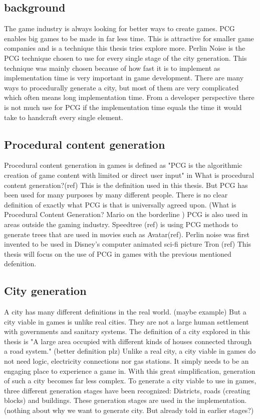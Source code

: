 	\subsection{background}
	The game industry is always looking for better ways to create games. PCG enables big games to be made in far less time. This is attractive for smaller game companies and is a technique this thesis tries explore more.
	Perlin Noise is the PCG technique chosen to use for every single stage of the city generation. This technique was mainly chosen because of how fast it is to implement as implementation time is very important in game development.
	There are many ways to procedurally generate a city, but most of them are very complicated which often means long implementation time. From a developer perspective there is not much use for PCG if the implementation time equals the time it would take to handcraft every single element.
	
	\subsection{Procedural content generation}
	Procedural content generation in games is defined as "PCG is the algorithmic creation of game content with limited or direct user input" in What is procedural content generation?(ref) This is the definition used in this thesis. But PCG has been used for many purposes by many different people. There is no clear definition of exactly what PCG is that is universally agreed upon. (What is Procedural Content Generation?	Mario on the borderline
)
	PCG is also used in areas outside the gaming industry. Speedtree (ref) is using PCG methods to generate trees that are used in movies such as Avatar(ref). Perlin noise was first invented to be used in Disney's computer animated sci-fi picture Tron (ref)
	This thesis will focus on the use of PCG in games with the previous mentioned defenition.
	
	\subsection{City generation}
	A city has many different definitions in the real world. (maybe example) But a city viable in games is unlike real cities. They are not a large human settlement with governments and sanitary systems. The definition of a city explored in this thesis is "A large area occupied with different kinds of houses connected through a road system." (better definition plz)
	Unlike a real city, a city viable in games do not need logic, electricity connections nor gas stations. It simply needs to be an engaging place to experience a game in. With this great simplification, generation of such a city becomes far less complex.
	To generate a city viable to use in games, three different generation stages have been recognized: Districts, roads (creating blocks) and buildings. These generation stages are used in the implementation. (nothing about why we want to generate city. But already told in earlier stages?)
	
